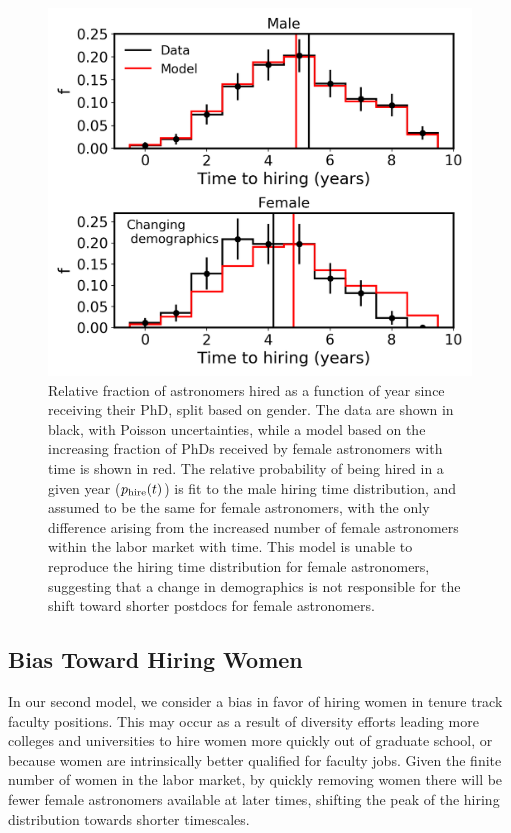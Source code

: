 \documentclass[modern]{aastex62}
\begin{document}
\begin{figure}[!hbt]
\center
\includegraphics[scale=.6]{model1.png}
\caption{Relative fraction of astronomers hired as a function of year since receiving their PhD, split based on gender. The data are shown in black, with Poisson uncertainties, while a model based on the increasing fraction of PhDs received by female astronomers with time is shown in red. The relative probability of being hired in a given year ($p_{\rm hire}(t)$) is fit to the male hiring time distribution, and assumed to be the same for female astronomers, with the only difference arising from the increased number of female astronomers within the labor market with time. This model is unable to reproduce the hiring time distribution for female astronomers, suggesting that a change in demographics is not responsible for the shift toward shorter postdocs for female astronomers.  \label{model1}}
\end{figure}
 

\subsection{Bias Toward Hiring Women}
In our second model, we consider a bias in favor of hiring women in tenure track faculty positions. This may occur as a result of diversity efforts leading more colleges and universities to hire women more quickly out of graduate school, or because women are intrinsically better qualified for faculty jobs. Given the finite number of women in the labor market, by quickly removing women there will be fewer female astronomers available at later times, shifting the peak of the hiring distribution towards shorter timescales.
\end{document}
